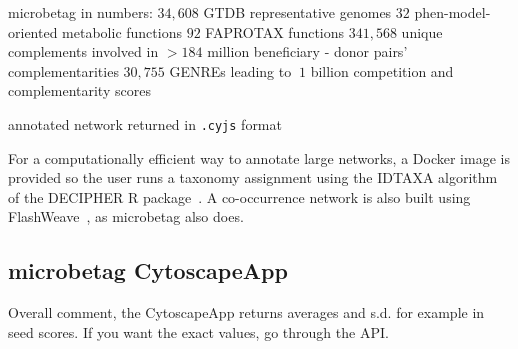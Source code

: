 \documentclass[sn-mathphys,Numbered]{sn-jnl}%
\theoremstyle{thmstyleone}%
\theoremstyle{thmstyletwo}%
\theoremstyle{thmstylethree}%
\begin{document}
        microbetag in numbers:
        $34,608$ GTDB representative genomes
        $32$ phen-model-oriented metabolic functions 
        $92$ FAPROTAX functions
        $341,568$ unique complements involved in $>184$ million beneficiary - donor pairs' complementarities
        $30,755$ GENREs leading to $~1$ billion competition and complementarity scores
        
        annotated network returned in \texttt{.cyjs} format


        For a computationally efficient way to annotate large networks, a Docker image is provided so the user runs a taxonomy assignment using the IDTAXA algorithm~\cite{murali2018idtaxa} of the DECIPHER R package~\cite{wright2016using}.
        A co-occurrence network is also built using FlashWeave~\cite{flashweave_cite}, as microbetag also does. 
            

        

    \subsection*{microbetag CytoscapeApp}
        \label{subsec:cytoapp}

    Overall comment, the CytoscapeApp returns averages and s.d. for example in seed scores. 
    If you want the exact values, go through the API. 
\end{document}
